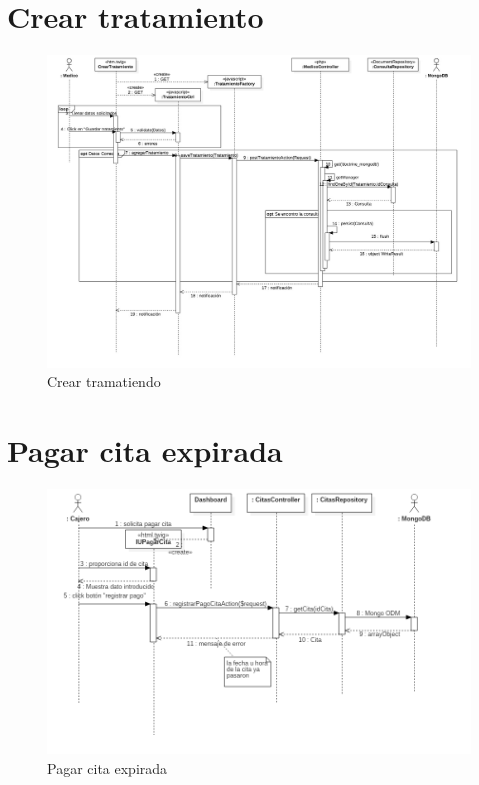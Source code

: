 \section{ Crear tratamiento}
\begin{figure}[htbp!]
	\centering
	\includegraphics[width=1\textwidth]{uml/DiagramasSecuencia/AdrianGalindo/crearTratamiento}
	\caption{Crear tramatiendo}
\end{figure}

\newpage


\section{Pagar cita expirada}

\begin{figure}[htbp!]
	\centering
	\includegraphics[width=1\textwidth]{uml/DiagramasSecuencia/DavidPacheco/pagar-cita-cita-expirada}
	\caption{Pagar cita expirada}
\end{figure}
\newpage

